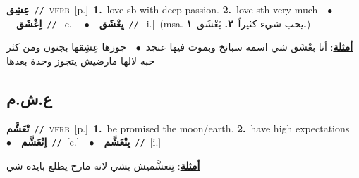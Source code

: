 \documentclass[10pt,a4paper,twoside]{article} %
\begin{document}
\begin{multicols}{2}
{\setlength\topsep{0pt}\textbf{\foreignlanguage{arabic}{عِشِق}}\ {\color{gray}\texttt{//}\color{black}}\ \textsc{verb}\ [p.]\ \textbf{1.}~love sb with deep passion.  \textbf{2.}~love sth very much\ \ $\bullet$\ \ \setlength\topsep{0pt}\textbf{\foreignlanguage{arabic}{اِعْشَق}}\ {\color{gray}\texttt{//}\color{black}}\ [c.]\ \ $\bullet$\ \ \setlength\topsep{0pt}\textbf{\foreignlanguage{arabic}{يِعْشَق}}\ {\color{gray}\texttt{//}\color{black}}\ [i.]\ \color{gray}(msa. \foreignlanguage{arabic}{يحب شيء كثيراً}~\foreignlanguage{arabic}{\textbf{٢.}}  \foreignlanguage{arabic}{يَعْشَق}~\foreignlanguage{arabic}{\textbf{١.}})\color{black}\  \begin{flushright}\color{gray}\foreignlanguage{arabic}{\textbf{\underline{\foreignlanguage{arabic}{أمثلة}}}: أنا بعْشَق شي اسمه سبانخ وبموت فيها عنجد\ $\bullet$\ \  جوزها عِشِقها بجنون ومن كثر حبه لالها مارضيش يتجوز وحدة بعدها}\end{flushright}\color{black}} \vspace{2mm}

\vspace{-3mm}
\subsection*{\color{blue}\foreignlanguage{arabic}{ع.ش.م}\color{blue}{}} 

{\setlength\topsep{0pt}\textbf{\foreignlanguage{arabic}{تْعَشَّم}}\ {\color{gray}\texttt{//}\color{black}}\ \textsc{verb}\ [p.]\ \textbf{1.}~be promised the moon/earth.  \textbf{2.}~have high expectations\ \ $\bullet$\ \ \setlength\topsep{0pt}\textbf{\foreignlanguage{arabic}{اِتْعَشَّم}}\ {\color{gray}\texttt{//}\color{black}}\ [c.]\ \ $\bullet$\ \ \setlength\topsep{0pt}\textbf{\foreignlanguage{arabic}{يِتْعَشَّم}}\ {\color{gray}\texttt{//}\color{black}}\ [i.]\  \begin{flushright}\color{gray}\foreignlanguage{arabic}{\textbf{\underline{\foreignlanguage{arabic}{أمثلة}}}: تِتعشَّميش بشي لانه مارح يطلع بايده شي}\end{flushright}\color{black}} \vspace{2mm}


\end{multicols}
\end{document}
